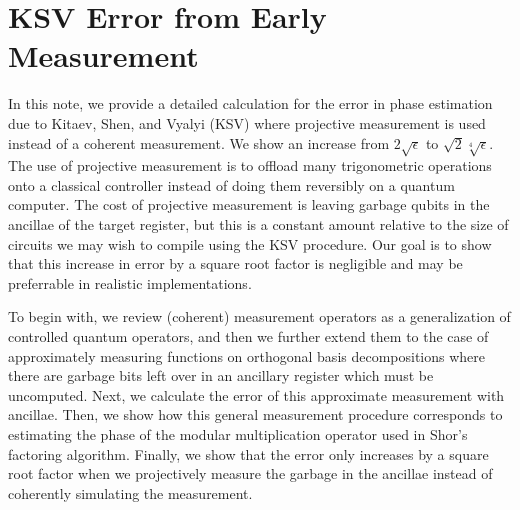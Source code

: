 \chapter{KSV Error from Early Measurement}
\label{app:ksv-error}

In this note, we provide a detailed calculation for the error in
phase estimation due to Kitaev, Shen, and Vyalyi (KSV) where projective
measurement is used instead of a coherent measurement. We show an
increase from $2\sqrt{\epsilon}$ to $\sqrt{2}\sqrt[4]{\epsilon}$. The use
of projective measurement is to offload many trigonometric operations
onto a classical controller instead of doing them reversibly on a quantum
computer. The cost of projective measurement is leaving garbage qubits in
the ancillae of the target register, but this is a constant amount relative to
the size of circuits we may wish to compile using the KSV procedure.
Our goal is to show that this increase in error by a square root
factor is negligible and may be preferrable in realistic implementations.

To begin with, we review (coherent) measurement operators as a generalization of
controlled quantum operators, and then we further extend them to the case
of approximately measuring functions on orthogonal basis decompositions
where there are garbage bits left over in an ancillary register which must
be uncomputed.
Next, we calculate the error of this approximate measurement with ancillae.
Then, we show how this general measurement procedure corresponds to
estimating the phase of the modular multiplication operator used in
Shor's factoring algorithm. Finally, we show that the error only
increases by a square root factor when we projectively measure the garbage
in the ancillae instead of coherently simulating the measurement.






